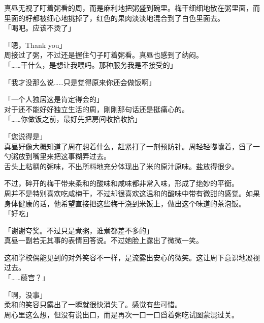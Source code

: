 真昼无视了盯着粥看的周，而是麻利地把粥盛到碗里。梅干细细地散在粥里面，而里面的籽都被细心地挑掉了，红色的果肉淡淡地混合到了白色里面去。\\

「喝吧。应该不烫了」

「嗯，Thank you」\\

周接过了粥，不过还是握住勺子盯着粥看。真昼也感到了纳闷。\\

「……干什么，是想让我喂吗。那种服务我是不接受的」

「我才没那么说……只是觉得原来你还会做饭啊」

「一个人独居这是肯定得会的」\\

对于还不能好好独立生活的周，刚刚那句话还是挺痛心的。\\

「……你做饭之前，最好先把房间收拾收拾」

「您说得是」\\

真昼好像大概知道了周在想着什么，赶紧打了一剂预防针。周轻轻嘟囔着，舀了一勺粥放到嘴里来把这事糊弄过去。\\

舌头上粘稠的粥味，不出所料地充分体现出了米的原汁原味。盐放得很少。

不过，碎开的梅干带来柔和的酸味和咸味都非常入味，形成了绝妙的平衡。\\

周并不是特别喜欢吃咸梅干，不过却很喜欢这温和的酸味中带有微甜的感觉。如果身体健康的话，他希望直接把这些梅干浇到米饭上，做出这个味道的茶泡饭。\\

「好吃」

「谢谢夸奖。不过只是煮粥，谁煮都差不多的」\\

真昼一副若无其事的表情回答说。不过她脸上露出了微微一笑。

这和学校偶能见到的对外笑容不一样，是流露出安心的微笑。这让周下意识地凝视过去。\\

「……藤宫？」

「啊，没事」\\

柔和的笑容只露出了一瞬就很快消失了。感觉有些可惜。\\

周心里这么想，但没有说出口，而是再次一口一口舀着粥吃试图蒙混过关。
